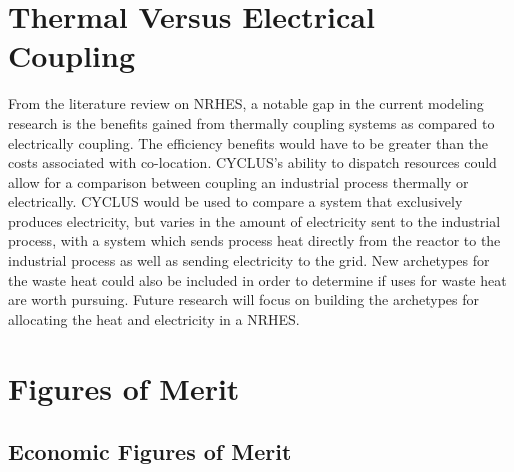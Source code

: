 \documentclass[12pt]{UIdahoMastersThesis}
\begin{document}
\chapter{Thermal Versus Electrical Coupling}
From the literature review on NRHES, a notable gap in the current modeling research is the benefits gained from thermally coupling systems as compared to electrically coupling.  The efficiency benefits would have to be greater than the costs associated with co-location.  CYCLUS's ability to dispatch resources could allow for a comparison between coupling an industrial process thermally or electrically. CYCLUS would be used to compare a system that exclusively produces electricity, but varies in the amount of electricity sent to the industrial process, with a system which sends process heat directly from the reactor to the industrial process as well as sending electricity to the grid.   New archetypes for the waste heat could also be included in order to determine if uses for waste heat are worth pursuing.  Future research will focus on building the archetypes for allocating the heat and electricity in a NRHES.

\chapter{Figures of Merit}
\section{Economic Figures of Merit}
\end{document}
